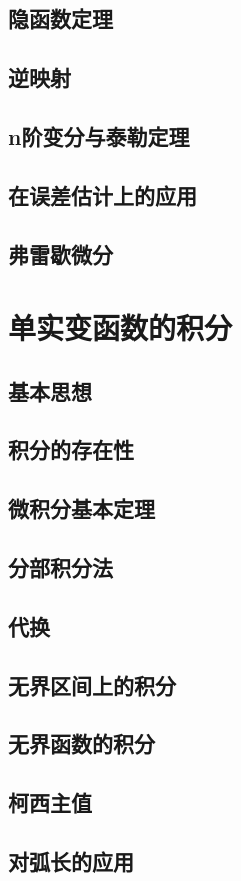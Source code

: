 \section{隐函数定理}
\section{逆映射}
\section{n阶变分与泰勒定理}
\section{在误差估计上的应用}
\section{弗雷歇微分}

\chapter{单实变函数的积分}
\section{基本思想}
\section{积分的存在性}
\section{微积分基本定理}
\section{分部积分法}
\section{代换}
\section{无界区间上的积分}
\section{无界函数的积分}
\section{柯西主值}
\section{对弧长的应用}
